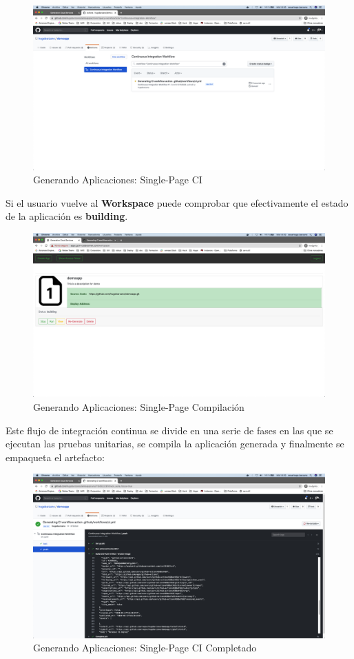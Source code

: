 \documentclass[a4paper,11pt]{book}
\begin{document}
\begin{figure}[H]
\centering
\includegraphics[scale=0.2]{imagenes/casouso/11.png}
\caption{  Generando Aplicaciones: Single-Page CI }
\end{figure}

Si el usuario vuelve al \textbf{Workspace} puede comprobar que efectivamente el estado de la aplicación es \textbf{building}. 
\begin{figure}[H]
\centering
\includegraphics[scale=0.2]{imagenes/casouso/12.png}
\caption{ Generando Aplicaciones: Single-Page Compilación  }
\end{figure}


Este flujo de integración continua se divide en una serie de fases en las que se ejecutan las pruebas unitarias, se compila la aplicación generada y finalmente se empaqueta el artefacto:

\begin{figure}[H]
\centering
\includegraphics[scale=0.2]{imagenes/casouso/13.png}
\caption{ Generando Aplicaciones: Single-Page CI Completado  }
\end{figure}
\end{document}
